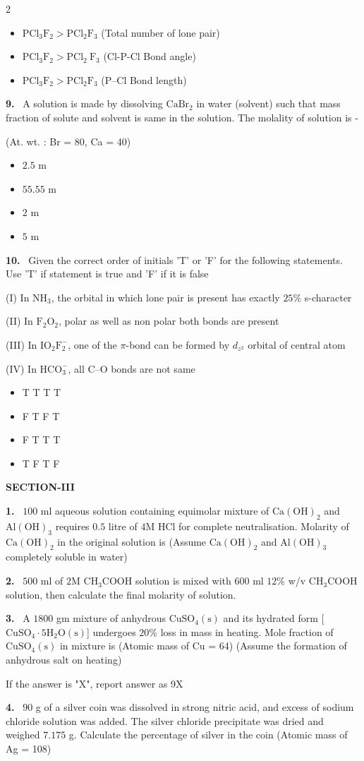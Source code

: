 \documentclass[10pt]{extarticle}
\newcommand{\sect}[1]{\par\smallskip\noindent\textbf{#1}\par}
\newcommand{\qn}[1]{\par\smallskip\noindent\textbf{#1.}~}
\newenvironment{qoptions}{\begin{itemize}[leftmargin=1.8em,itemsep=1pt,topsep=2pt,label={}]}{\end{itemize}}
\newcommand{\opt}[2]{\item[(#1)] #2}
\begin{document}
\begin{multicols}{2}
\begin{qoptions}
\opt{B}{$\mathrm{PCl_3F_2>PCl_2F_3}$ (Total number of lone pair)}
\opt{C}{$\mathrm{PCl_3F_2>PCl_2\ F_3}$ (Cl-P-Cl Bond angle)}
\opt{D}{$\mathrm{PCl_3F_2>PCl_2F_3}$ (P--Cl Bond length)}
\end{qoptions}
\qn{9} A solution is made by dissolving $\mathrm{CaBr_2}$ in water (solvent) such that mass fraction of solute and solvent is same in the solution. The molality of solution is -\par
(At. wt. : Br = 80, Ca = 40)
\begin{qoptions}
\opt{A}{$2.5$ m}
\opt{B}{$55.55$ m}
\opt{C}{$2$ m}
\opt{D}{$5$ m}
\end{qoptions}
\qn{10} Given the correct order of initials 'T' or 'F' for the following statements. Use 'T' if statement is true and 'F' if it is false\par
(I) In $\mathrm{NH_3}$, the orbital in which lone pair is present has exactly $25\%$ s-character\par
(II) In $\mathrm{F_2O_2}$, polar as well as non polar both bonds are present\par
(III) In $\mathrm{IO_2F_2^-}$, one of the $\pi$-bond can be formed by $d_{z^2}$ orbital of central atom\par
(IV) In $\mathrm{HCO_3^-}$, all C--O bonds are not same
\begin{qoptions}
\opt{A}{T T T T}
\opt{B}{F T F T}
\opt{C}{F T T T}
\opt{D}{T F T F}
\end{qoptions}
\sect{SECTION-III}
\qn{1} $100$ ml aqueous solution containing equimolar mixture of $\mathrm{Ca(OH)_2}$ and $\mathrm{Al(OH)_3}$ requires $0.5$ litre of $4$M HCl for complete neutralisation. Molarity of $\mathrm{Ca(OH)_2}$ in the original solution is (Assume $\mathrm{Ca(OH)_2}$ and $\mathrm{Al(OH)_3}$ completely soluble in water)
\qn{2} $500$ ml of $2$M $\mathrm{CH_3COOH}$ solution is mixed with $600$ ml $12\%$ w/v $\mathrm{CH_3COOH}$ solution, then calculate the final molarity of solution.
\qn{3} A $1800$ gm mixture of anhydrous $\mathrm{CuSO_4(s)}$ and its hydrated form [$\mathrm{CuSO_4{\cdot}5H_2O(s)}$] undergoes $20\%$ loss in mass in heating. Mole fraction of $\mathrm{CuSO_4(s)}$ in mixture is (Atomic mass of Cu = 64) (Assume the formation of anhydrous salt on heating)\par
If the answer is "X", report answer as 9X
\qn{4} $90$ g of a silver coin was dissolved in strong nitric acid, and excess of sodium chloride solution was added. The silver chloride precipitate was dried and weighed $7.175$ g. Calculate the percentage of silver in the coin (Atomic mass of Ag = 108)\par

\end{multicols}
\end{document}
